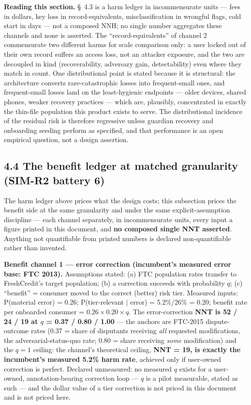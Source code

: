 \documentclass[
]{article}
\newcounter{none} %
\begin{document}
\textbf{Reading this section.} §~4.3 is a harm ledger in incommensurate
units --- fees in dollars, key loss in record-equivalents,
misclassification in wrongful flags, cold start in days --- not a
composed NNH; no single number aggregates these channels and none is
asserted. The ``record-equivalents'' of channel 2 commensurate two
different harms for scale comparison only: a user locked out of their
own record suffers an access loss, not an attacker exposure, and the two
are decoupled in kind (recoverability, adversary gain, detectability)
even where they match in count. One distributional point is stated
because it is structural: the architecture converts rare-catastrophic
losses into frequent-small ones, and frequent-small losses land on the
least-hygienic endpoints --- older devices, shared phones, weaker
recovery practices --- which are, plausibly, concentrated in exactly the
thin-file population this product exists to serve. The distributional
incidence of the residual risk is therefore regressive unless guardian
recovery and onboarding seeding perform as specified, and that
performance is an open empirical question, not a design assertion.

\subsection{4.4 The benefit ledger at matched granularity (SIM-R2
battery
6)}\label{the-benefit-ledger-at-matched-granularity-sim-r2-battery-6}

The harm ledger above prices what the design costs; this subsection
prices the benefit side at the same granularity and under the same
explicit-assumption discipline --- each channel separately, in
incommensurate units, every input a figure printed in this document, and
\textbf{no composed single NNT asserted}. Anything not quantifiable from
printed numbers is declared non-quantifiable rather than invented.

\textbf{Benefit channel 1 --- error correction (incumbent's measured
error base: FTC 2013).} Assumptions stated: (a) FTC population rates
transfer to FreshCredit's target population; (b) a correction succeeds
with probability \(q\); (c) ``benefit'' = consumer moved to the correct
(better) risk tier. Measured inputs: P(material error) = 0.26;
P(tier-relevant \(|\) error) = 5.2\%/26\% = 0.20; benefit rate per
onboarded consumer = \(0.26 \times 0.20 \times q\). The error-correction
\textbf{NNT is 52 / 24 / 19 at \(q\) = 0.37 / 0.80 / 1.00} --- the
anchors are FTC-2015 dispute-outcome rates (0.37 = share of disputants
receiving \emph{all} requested modifications, the adversarial-status-quo
rate; 0.80 = share receiving \emph{some} modification) and the \(q = 1\)
ceiling: the channel's theoretical ceiling, \textbf{NNT = 19, is exactly
the incumbent's measured 5.2\% harm rate}, achieved only if user-owned
correction is perfect. Declared unmeasured: no measured \(q\) exists for
a user-owned, annotation-bearing correction loop --- \(q\) is a pilot
measurable, stated as such --- and the dollar value of a tier correction
is not priced in this document and is not priced here.
\end{document}

